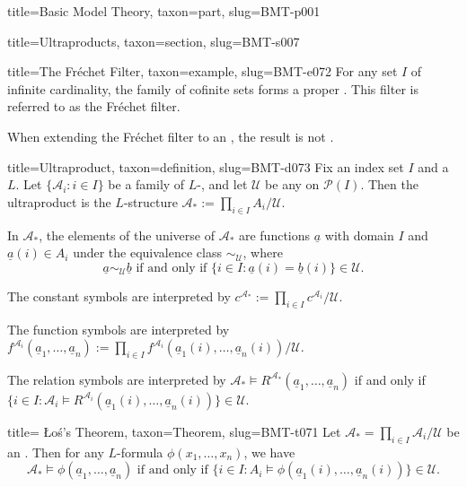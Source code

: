 \documentclass[a4paper]{article}
\begin{document}
\begin{tree}{title={Basic Model Theory}, taxon={part}, slug={BMT-p001}}
\begin{tree}{title={Ultraproducts}, taxon={section}, slug={BMT-s007}}
\begin{tree}{title={The Fréchet Filter}, taxon={example}, slug={BMT-e072}}
For any set \(I\) of infinite cardinality, the family of cofinite sets forms a proper . This filter is referred to as the Fréchet filter.\par{When extending the Fréchet filter to an , the result is not .}
\end{tree}

\begin{tree}{title={Ultraproduct}, taxon={definition}, slug={BMT-d073}}
Fix an index set \(I\) and a  \(L\). Let \(\{ \mathcal {A}_i: i \in  I \}\) be a family of \(L\)-, and let \(\mathcal {U}\) be any  on \(\mathcal {P}(I)\). Then the ultraproduct is the \(L\)-structure \(\mathcal {A}_* :=  \prod \limits _{i \in  I} A_i / \mathcal {U}\). \par{In \(\mathcal {A}_*\), the elements of the universe of \(\mathcal {A}_*\) are functions \(\underline {a}\) with domain \(I\) and \(\underline {a}(i) \in  A_i\) under the equivalence class \(\sim _{ \mathcal {U}}\), where \[\underline {a} \sim _{ \mathcal {U}} \underline {b}  \text { if and only if } \{ i \in  I:  \underline {a}(i)= \underline {b}(i) \}   \in   \mathcal {U}.\]}\par{The constant symbols are interpreted by \(c^{ \mathcal {A}_*} :=  \prod \limits _{i \in  I} c^{ \mathcal {A}_i} / \mathcal {U}\). }\par{The function symbols are interpreted by \(f^{ \mathcal {A}_i}( \underline {a}_1, \dots ,  \underline {a}_n) :=  \prod \limits _{i \in  I} f^{ \mathcal {A}_i}( \underline {a}_1(i), \dots , \underline {a}_n(i)) /  \mathcal {U} \). }\par{The relation symbols are interpreted by \(\mathcal {A}_* \models  R^{ \mathcal {A}_*}( \underline {a}_1, \dots ,  \underline {a}_n)\) if and only if \(\{ i \in  I:  \mathcal {A}_i \models  R^{ \mathcal {A}_i}( \underline {a}_1(i), \dots ,  \underline {a}_n(i)) \} \in   \mathcal {U}\).}
\end{tree}

\begin{tree}{title={ Łoś's Theorem}, taxon={Theorem}, slug={BMT-t071}}
Let \(\mathcal {A}_* =  \prod \limits _{i \in  I}  \mathcal {A}_i /  \mathcal {U}\) be an . Then for any \(L\)-formula \(\phi (x_1, \dots ,x_n)\), we have \[\mathcal {A}_* \models   \phi ( \underline {a}_1, \dots , \underline {a}_n)  \text { if and only if }  \{ i \in  I: A_i \models \phi ( \underline {a}_1(i), \dots ,  \underline {a}_n(i)) \} \in \mathcal {U}.\]
\end{tree}


\end{tree}
\end{tree}
\end{document}
